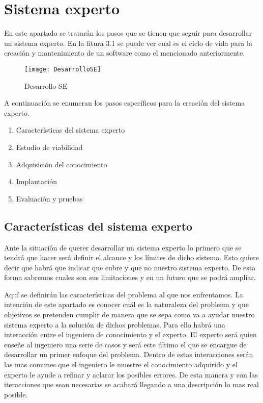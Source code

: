 \section{Sistema experto}
En este apartado se tratarán los pasos que se tienen que seguir para desarrollar un sistema experto.
 En la fitura 3.1 se puede ver cual es el ciclo de vida para la creación y mantenimiento de un software
 como el mencionado anteriormente.

\begin{figure}[htb]
  \centering
    \texttt{[image: DesarrolloSE]}
  \caption[Desarrollo SE]{Desarrollo SE}
  \label{fig:Desarrollo Sistema Experto}
\end{figure}

A continuación se enumeran los pasos específicos para la creación del sistema experto.
\begin{enumerate}
  \item Características del sistema experto
  \item Estudio de viabilidad
  \item Adquisición del conocimiento
  \item Implantación
  \item Evaluación y pruebas
\end{enumerate}

\subsection{Características del sistema experto}

Ante la situación de querer desarrollar un sistema experto lo primero que se tendrá
 que hacer será definir el alcance y los límites de dicho sistema. Esto quiere decir que
 habrá que indicar que cubre y que no nuestro sistema experto. De esta forma sabremos
 cuales son sus limitaciones y en un futuro que se podrá ampliar.


Aquí se definirán las características del problema al que nos enfrentamos.
 La intención de este apartado es conocer cuál es la naturaleza del problema
 y que objetivos se pretenden cumplir de manera que se sepa como va a ayudar
 nuestro sistema experto a la solución de dichos problemas. Para ello habrá
 una interacción entre el ingeniero de conocimiento y el experto. El experto
 será quien enseñe al ingeniero una serie de casos y será este último el que se
 encargue de desarrollar un primer enfoque del problema. Dentro de estas interacciones
 serán las mas comunes que el ingeniero le muestre el conocimiento adquirido
 y el experto le ayude a refinar y aclarar los posibles errores. De esta manera
 y con las iteracciones que sean necesarias se acabará llegando a una descripción
 lo mas real posible.

